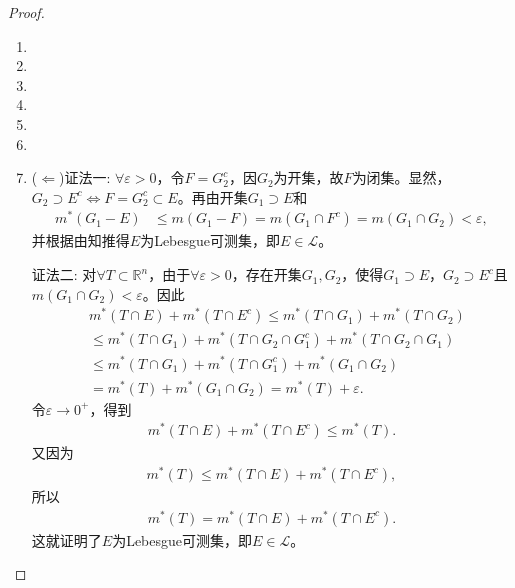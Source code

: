 \documentclass[../../main.tex]{subfiles}%
\begin{document}
\begin{proof}
\begin{enumerate}
\item 

\item 

\item 

\item 

\item 

\item 

\item ($\Leftarrow$){\color{blue}证法一:} $\forall\varepsilon>0$，令$F=G_2^c$，因$G_2$为开集，故$F$为闭集。显然，$G_2\supset E^c \iff F=G_2^c\subset E$。再由开集$G_1\supset E$和
\begin{align*}
m^*(G_1-E) &\leqslant m(G_1-F) = m(G_1\cap F^c) = m(G_1\cap G_2) < \varepsilon,
\end{align*}
并根据由知推得$E$为Lebesgue可测集，即$E\in\mathscr{L}$。

{\color{blue}证法二:} 对$\forall T\subset\mathbb{R}^n$，由于$\forall\varepsilon>0$，存在开集$G_1,G_2$，使得$G_1\supset E$，$G_2\supset E^c$且$m(G_1\cap G_2)<\varepsilon$。因此
\begin{align*}
&m^*(T\cap E)+m^*(T\cap E^c) \leqslant m^*(T\cap G_1)+m^*(T\cap G_2) \\
&\leqslant m^*(T\cap G_1)+m^*(T\cap G_2\cap G_1^c)+m^*(T\cap G_2\cap G_1) \\
&\leqslant m^*(T\cap G_1)+m^*(T\cap G_1^c)+m^*(G_1\cap G_2) \\
&= m^*(T)+m^*(G_1\cap G_2) = m^*(T)+\varepsilon.
\end{align*}
令$\varepsilon\to 0^+$，得到
\begin{align*}
m^*(T\cap E)+m^*(T\cap E^c) \leqslant m^*(T).
\end{align*}
又因为
\begin{align*}
m^*(T) \leqslant m^*(T\cap E)+m^*(T\cap E^c),
\end{align*}
所以
\begin{align*}
m^*(T) = m^*(T\cap E)+m^*(T\cap E^c).
\end{align*}
这就证明了$E$为Lebesgue可测集，即$E\in\mathscr{L}$。


\end{enumerate}
\end{proof}
\end{document}
